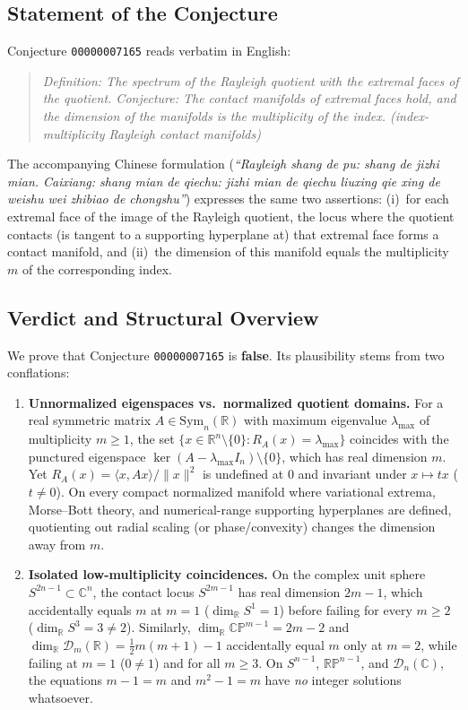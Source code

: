 \documentclass[11pt,a4paper]{article}
\theoremstyle{definition}
\theoremstyle{remark}
\newcommand{\RR}{\mathbb{R}}
\newcommand{\CC}{\mathbb{C}}
\newcommand{\RP}{\mathbb{RP}}
\newcommand{\CP}{\mathbb{CP}}
\newcommand{\cD}{\mathcal{D}}
\newcommand{\Sym}{\mathrm{Sym}}
\begin{document}
\subsection{Statement of the Conjecture}
Conjecture \texttt{00000007165} reads verbatim in English:
\begin{quote}
\emph{Definition: The spectrum of the Rayleigh quotient with the extremal faces of the quotient. Conjecture: The contact manifolds of extremal faces hold, and the dimension of the manifolds is the multiplicity of the index. (index-multiplicity Rayleigh contact manifolds)}
\end{quote}
The accompanying Chinese formulation (\emph{``Rayleigh shang de pu: shang de jizhi mian. Caixiang: shang mian de qiechu: jizhi mian de qiechu liuxing qie xing de weishu wei zhibiao de chongshu''}) expresses the same two assertions: (i)~for each extremal face of the image of the Rayleigh quotient, the locus where the quotient contacts (is tangent to a supporting hyperplane at) that extremal face forms a contact manifold, and (ii)~the dimension of this manifold equals the multiplicity $m$ of the corresponding index.

\subsection{Verdict and Structural Overview}
We prove that Conjecture \texttt{00000007165} is \textbf{false}. Its plausibility stems from two conflations:
\begin{enumerate}
  \item \textbf{Unnormalized eigenspaces vs.\ normalized quotient domains.} For a real symmetric matrix $A \in \Sym_n(\RR)$ with maximum eigenvalue $\lambda_{\max}$ of multiplicity $m \ge 1$, the set $\{x \in \RR^n \setminus \{0\} : R_A(x) = \lambda_{\max}\}$ coincides with the punctured eigenspace $\ker(A - \lambda_{\max} I_n) \setminus \{0\}$, which has real dimension $m$. Yet $R_A(x) = \langle x, A x \rangle / \|x\|^2$ is undefined at $0$ and invariant under $x \mapsto t x$ ($t \neq 0$). On every compact normalized manifold where variational extrema, Morse--Bott theory, and numerical-range supporting hyperplanes are defined, quotienting out radial scaling (or phase/convexity) changes the dimension away from $m$.
  \item \textbf{Isolated low-multiplicity coincidences.} On the complex unit sphere $S^{2n-1} \subset \CC^n$, the contact locus $S^{2m-1}$ has real dimension $2m - 1$, which accidentally equals $m$ at $m = 1$ ($\dim_{\RR} S^1 = 1$) before failing for every $m \ge 2$ ($\dim_{\RR} S^3 = 3 \neq 2$). Similarly, $\dim_{\RR} \CP^{m-1} = 2m - 2$ and $\dim_{\RR} \cD_m(\RR) = \frac{1}{2}m(m+1) - 1$ accidentally equal $m$ only at $m = 2$, while failing at $m = 1$ ($0 \neq 1$) and for all $m \ge 3$. On $S^{n-1}$, $\RP^{n-1}$, and $\cD_n(\CC)$, the equations $m - 1 = m$ and $m^2 - 1 = m$ have \emph{no} integer solutions whatsoever.
\end{enumerate}
\end{document}
